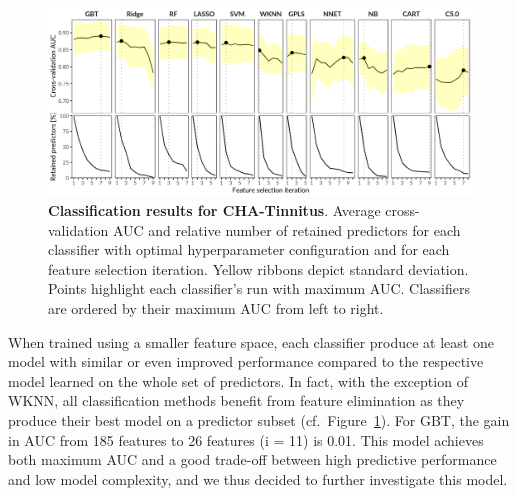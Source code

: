 \documentclass[
  oneside]{book}
\begin{document}
\begin{figure}

{\centering \includegraphics[width=1\linewidth]{figures/09-results-pone} 

}

\caption{\textbf{Classification results for CHA-Tinnitus}. Average cross-validation AUC and relative number of retained predictors for each classifier with optimal hyperparameter configuration and for each feature selection iteration. Yellow ribbons depict standard deviation. Points highlight each classifier's run with maximum AUC. Classifiers are ordered by their maximum AUC from left to right.}\label{fig:09-results-pone}
\end{figure}

When trained using a smaller feature space, each classifier produce at least one model with similar or even improved performance compared to the respective model learned on the whole set of predictors.
In fact, with the exception of WKNN, all classification methods benefit from feature elimination as they produce their best model on a predictor subset (cf.~Figure~\ref{fig:09-results-pone}).
For GBT, the gain in AUC from 185 features to 26 features (i = 11) is 0.01.
This model achieves both maximum AUC and a good trade-off between high predictive performance and low model complexity, and we thus decided to further investigate this model.
\end{document}
